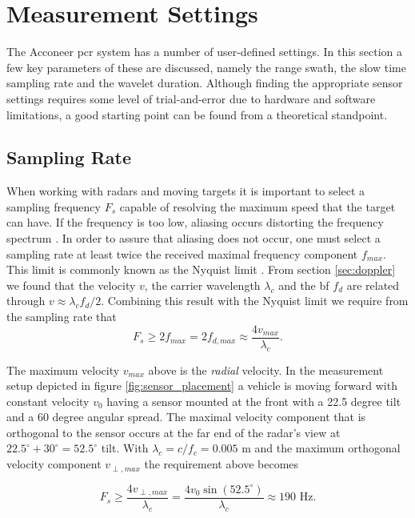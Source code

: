 \section{Measurement Settings}

The Acconeer \gls{pcr} system has a number of user-defined settings. In this section a few key parameters of these are discussed, namely the range swath, the slow time sampling rate and the wavelet duration. Although finding the appropriate sensor settings requires some level of trial-and-error due to hardware and software limitations, a good starting point can be found from a theoretical standpoint. 

\subsection{Sampling Rate}\label{sec:srate}
When working with radars and moving targets it is important to select a sampling frequency $F_s$ capable of resolving the maximum speed that the target can have. If the frequency is too low, aliasing occurs distorting the frequency spectrum \citep{lindgren_rootzezn_sandsten_2014}. In order to assure that aliasing does not occur, one must select a sampling rate at least twice the received maximal frequency component $f_{max}$. This limit is commonly known as the Nyquist limit \citep{proakis_manolakis_1995}. From section \ref{sec:doppler} we found that the velocity $v$, the carrier wavelength $\lambda_c$ and the \gls{bf} $f_d$ are related through $v \approx \lambda_cf_d/2$. Combining this result with the Nyquist limit we require from the sampling rate that
\begin{equation}
\label{eq:nyquist}
		F_{s} \geq 2f_{max} 
		= 2f_{d,max} 
		\approx \frac{4v_{max}}{\lambda_c}.
\end{equation}

The maximum velocity $v_{max}$ above is the \emph{radial} velocity. In the measurement setup depicted in figure \ref{fig:sensor_placement} a vehicle is moving forward with constant velocity $v_0$ having a sensor mounted at the front with a 22.5 degree tilt and a 60 degree angular spread. The maximal velocity component that is orthogonal to the sensor occurs at the far end of the radar's view at $22.5^\circ + 30^\circ = 52.5^\circ$ tilt. With $\lambda_c=c/f_c=0.005$ m and the maximum orthogonal velocity component $v_{\perp, max}$ the requirement above becomes

\begin{equation}
	F_s \geq 
	\frac{4v_{\perp, max}}{\lambda_c}
	= \frac{4v_0\sin(52.5^\circ)}{\lambda_c} 
	\approx 190 \text{ Hz}.
\end{equation}

